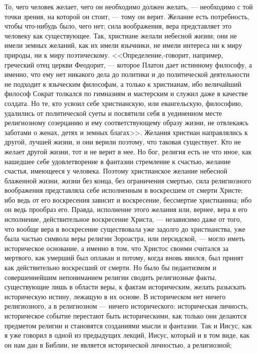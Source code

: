 \documentclass[12pt]{article}
\begin{document}
То, чего человек желает, чего он необходимо должен желать, --- необходимо с той точки зрения, на которой он стоит, --- тому он верит. Желание есть потребность, чтобы что-нибудь было, чего нет; сила воображения, вера представляет это человеку как существующее. Так, христиане желали небесной жизни; они не имели земных желаний, как их имели язычники, не имели интереса ни к миру природы, ни к миру поэтическому. <<Определение,-говорит, например, греческий отец церкви Феодорит, --- которое Платон дает истинному философу, а именно, что ему нет никакого дела до политики и до политической деятельности не подходит к языческим философам, а только к христианам, ибо величайший философ Сократ толкался по гимназиям и мастерским и служил даже в качестве солдата. Но те, кто усвоил себе христианскую, или евангельскую, философию, удалились от политической суеты и посвятили себя в уединенном месте религиозному созерцанию и ему соответствующему образу жизни, не отвлекаясь заботами о женах, детях и земных благах>>. Желания христиан направлялись к другой, лучшей жизни, и они верили поэтому, что таковая существует. Кто не желает другой жизни, тот и не верит в нее. Но бог, религия есть не что иное, как нашедшее себе удовлетворение в фантазии стремление к счастью, желание счастья, имеющееся у человека. Поэтому христианское желание небесной блаженной жизни, жизни без конца, без ограничения смертью, сила религиозного воображения представляла себе исполненным в воскресшем от смерти Христе; ибо ведь от его воскресения зависит и воскресение, бессмертие христианина; ибо он ведь прообраз его. Правда, исполнение этого желания или, вернее, вера в его исполнение, действительное воскресение Христа, --- независимо даже от того, что вообще вера в воскресение существовала уже задолго до христианства, уже была частью символа веры религии Зороастра, или персидской, --- могло иметь историческое основание, а именно в том, что Христос своими считался за мертвого, как умерший был оплакан и потому, когда вновь явился, был принят как действительно воскресший от смерти. Но было бы педантизмом и совершеннейшим непониманием религии сводить религиозные факты, существующие лишь в области веры, к фактам историческим, желать разыскать историческую истину, лежащую в их основе. В историческом нет ничего религиозного, а в религиозном --- ничего исторического: историческая личность, историческое событие перестают быть историческими, как только они делаются предметом религии и становятся созданиями мысли и фантазии. Так и Иисус, как я уже говорил в одной из предыдущих лекций, Иисус, который и в том виде, как он нам дан в Библии, не является исторической личностью, а религиозной; 
\end{document}
